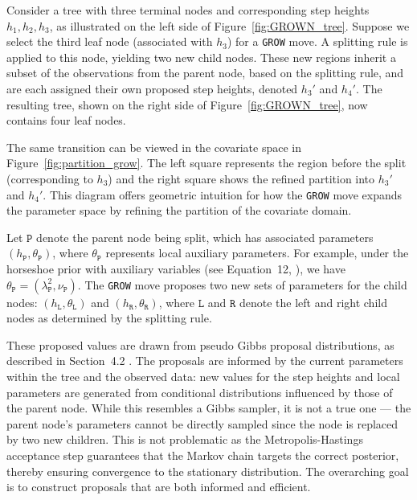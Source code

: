 Consider a tree with three terminal nodes and corresponding step heights ${h_1, h_2, h_3}$, as illustrated on the left side of Figure~\ref{fig:GROWN_tree}. 
Suppose we select the third leaf node (associated with $h_3$) for a \texttt{GROW} move. 
A splitting rule is applied to this node, yielding two new child nodes. 
These new regions inherit a subset of the observations from the parent node, based on the splitting rule, and are each assigned their own proposed step heights, denoted $h_3'$ and $h_4'$. 
The resulting tree, shown on the right side of Figure~\ref{fig:GROWN_tree}, now contains four leaf nodes.




The same transition can be viewed in the covariate space in Figure~\ref{fig:partition_grow}.
The left square represents the region before the split (corresponding to $h_3$) and the right square shows the refined partition into $h_3'$ and $h_4'$. 
This diagram offers geometric intuition for how the \texttt{GROW} move expands the parameter space by refining the partition of the covariate domain.




Let $\texttt{P}$ denote the parent node being split, which has associated parameters $(h_\texttt{P}, \theta_\texttt{P})$, where $\theta_\texttt{P}$ represents local auxiliary parameters. 
For example, under the horseshoe prior with auxiliary variables (see Equation~12, \citealp{main_article}), we have $\theta_\texttt{P} = (\lambda_\texttt{P}^2, \nu_\texttt{P})$. 
The \texttt{GROW} move proposes two new sets of parameters for the child nodes: $(h_\texttt{L}, \theta_\texttt{L})$ and $(h_\texttt{R}, \theta_\texttt{R})$, where $\texttt{L}$ and $\texttt{R}$ denote the left and right child nodes as determined by the splitting rule. 

These proposed values are drawn from pseudo Gibbs proposal distributions, as described in Section~4.2 \citep{main_article}. 
The proposals are informed by the current parameters within the tree and the observed data: new values for the step heights and local parameters are generated from conditional distributions influenced by those of the parent node. 
While this resembles a Gibbs sampler, it is not a true one — the parent node’s parameters cannot be directly sampled since the node is replaced by two new children. 
This is not problematic as the Metropolis-Hastings acceptance step guarantees that the Markov chain targets the correct posterior, thereby ensuring convergence to the stationary distribution. 
The overarching goal is to construct proposals that are both informed and efficient.


